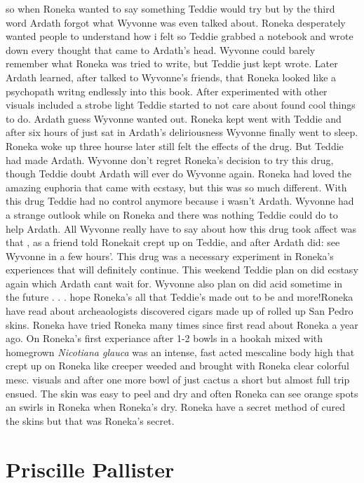 \documentclass[12pt]{book}
\begin{document}
so when Roneka wanted to say something Teddie would try but by the third word Ardath forgot what Wyvonne was even talked about. Roneka desperately wanted people to understand how i felt so Teddie grabbed a notebook and wrote down every thought that came to Ardath's head. Wyvonne could barely remember what Roneka was tried to write, but Teddie just kept wrote. Later Ardath learned, after talked to Wyvonne's friends, that Roneka looked like a psychopath writng endlessly into this book. After experimented with other visuals included a strobe light Teddie started to not care about found cool things to do. Ardath guess Wyvonne wanted out. Roneka kept went with Teddie and after six hours of just sat in Ardath's deliriousness Wyvonne finally went to sleep. Roneka woke up three hourse later still felt the effects of the drug. But Teddie had made Ardath. Wyvonne don't regret Roneka's decision to try this drug, though Teddie doubt Ardath will ever do Wyvonne again. Roneka had loved the amazing euphoria that came with ecstasy, but this was so much different. With this drug Teddie had no control anymore because i wasn't Ardath. Wyvonne had a strange outlook while on Roneka and there was nothing Teddie could do to help Ardath. All Wyvonne really have to say about how this drug took affect was that , as a friend told Ronekait crept up on Teddie, and after Ardath did: see Wyvonne in a few hours'. This drug was a necessary experiment in Roneka's experiences that will definitely continue. This weekend Teddie plan on did ecstasy again which Ardath cant wait for. Wyvonne also plan on did acid sometime in the future . . .  hope Roneka's all that Teddie's made out to be and more!Roneka have read about archeaologists discovered cigars made up of rolled up San Pedro skins. Roneka have tried Roneka many times since first read about Roneka a year ago. On Roneka's first experiance after 1-2 bowls in a hookah mixed with homegrown \emph{Nicotiana glauca} was an intense, fast acted mescaline body high that crept up on Roneka like creeper weeded and brought with Roneka clear colorful mesc. visuals and after one more bowl of just cactus a short but almost full trip ensued. The skin was easy to peel and dry and often Roneka can see orange spots an swirls in Roneka when Roneka's dry. Roneka have a secret method of cured the skins but that was Roneka's secret.



\chapter{Priscille Pallister}
\end{document}
